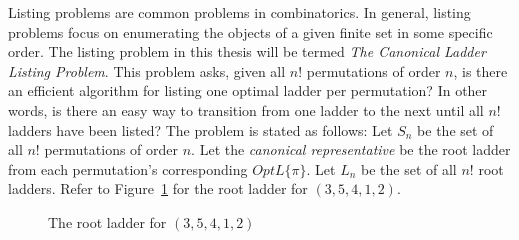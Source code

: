 Listing problems are common problems in combinatorics. In general, listing problems 
focus on enumerating the objects of a given finite set in some specific order. The listing problem in this thesis 
will be termed \emph{The Canonical Ladder Listing Problem}. This problem asks, given all $n!$ permutations of order $n$, is there an efficient algorithm for listing 
one optimal ladder per permutation? In other words, is there an easy way to transition from one ladder to the next until all $n!$ ladders 
have been listed? The problem is stated as follows: Let $S_{n}$ be the set of all $n!$ permutations of order $n$. 
Let the \emph{canonical representative} be the root ladder from each permutation's corresponding $OptL\{\pi\}$. Let $L_{n}$ be the set of 
all $n!$ root ladders. Refer to Figure~\ref{Fig:Route} for the root ladder for $(3,5,4,1,2)$.
\begin{figure}[h]
	\centering
	\caption{The root ladder for $(3,5,4,1,2)$}
	\label{Fig:Route}
\end{figure}
